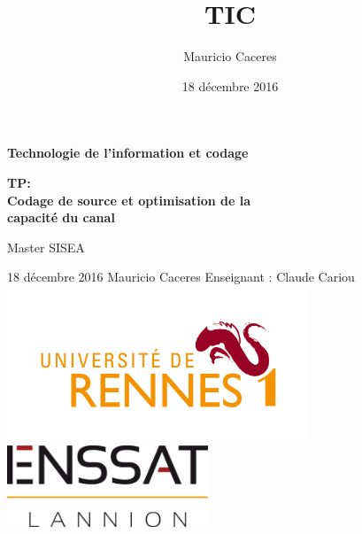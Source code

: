 \documentclass{report}
\title{TIC}
\author{Mauricio Caceres}
\date{18 décembre 2016}
\begin{document}
\begin{titlepage}
	\centering
	\vfill
{\bfseries\huge Technologie de l'information et codage}
	\vfill
	{\bfseries\LARGE
		TP:\\
		Codage de source et optimisation de la \\capacité du canal
		\\
		\vskip2cm

		Master SISEA\\
	
	}
	\vfill
	18 décembre 2016
	\vfill
	{\large Mauricio Caceres } \hfill  {\large Enseignant : Claude Cariou}
	\vfill
	\includegraphics[width=9cm]{rennes} %
	\vfill
	\includegraphics[width=6cm]{enssat} %
	\vfill
	\vfill
\end{titlepage}





\end{document}
